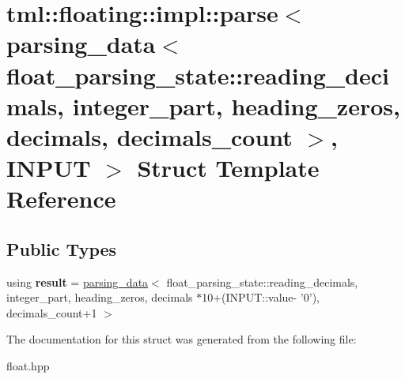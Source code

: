 \hypertarget{structtml_1_1floating_1_1impl_1_1parse_3_01parsing__data_3_01float__parsing__state_1_1reading__d64131a15d4170361c13b3d357544c0da}{\section{tml\+:\+:floating\+:\+:impl\+:\+:parse$<$ parsing\+\_\+data$<$ float\+\_\+parsing\+\_\+state\+:\+:reading\+\_\+decimals, integer\+\_\+part, heading\+\_\+zeros, decimals, decimals\+\_\+count $>$, I\+N\+P\+U\+T $>$ Struct Template Reference}
\label{structtml_1_1floating_1_1impl_1_1parse_3_01parsing__data_3_01float__parsing__state_1_1reading__d64131a15d4170361c13b3d357544c0da}
}
\subsection*{Public Types}
\begin{DoxyCompactItemize}
\item 
\hypertarget{structtml_1_1floating_1_1impl_1_1parse_3_01parsing__data_3_01float__parsing__state_1_1reading__d64131a15d4170361c13b3d357544c0da_a08da2c93292b3203f21d24f44037803c}{using {\bfseries result} = \hyperlink{structtml_1_1floating_1_1impl_1_1parsing__data}{parsing\+\_\+data}$<$ float\+\_\+parsing\+\_\+state\+::reading\+\_\+decimals, integer\+\_\+part, heading\+\_\+zeros, decimals $\ast$10+(I\+N\+P\+U\+T\+::value-\/ '0'), decimals\+\_\+count+1 $>$}\label{structtml_1_1floating_1_1impl_1_1parse_3_01parsing__data_3_01float__parsing__state_1_1reading__d64131a15d4170361c13b3d357544c0da_a08da2c93292b3203f21d24f44037803c}

\end{DoxyCompactItemize}


The documentation for this struct was generated from the following file\+:\begin{DoxyCompactItemize}
\item 
float.\+hpp\end{DoxyCompactItemize}
